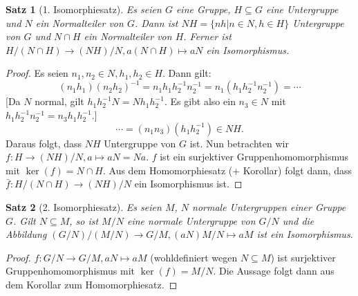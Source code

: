 \documentclass[12pt]{scrartcl} %
\newtheorem{thm}{Satz}
\theoremstyle{definition}
\theoremstyle{remark}
\begin{document}
\begin{thm}[1. Isomorphiesatz]
	Es seien $G$ eine Gruppe, $H \subseteq G$ eine Untergruppe und $N$ ein Normalteiler von $G$.
	Dann ist $NH = \{nh | n \in N, h \in H\}$ Untergruppe von $G$ und $N \cap H$ ein Normalteiler von $H$.
	Ferner ist $H/(N \cap H) \rightarrow (NH)/N, a(N \cap H) \mapsto aN$ ein Isomorphismus.
\end{thm}

\begin{proof}
	Es seien $n_1, n_2 \in N, h_1, h_2 \in H$. Dann gilt:
	$$ (n_1h_1)(n_2h_2)^{-1} = n_1h_1h_2^{-1}n_2^{-1} = n_1(h_1h_2^{-1}n_2^{-1}) = \dotsb $$
	[Da $N$ normal, gilt $h_1h_2^{-1}N = Nh_1h_2^{-1}$.
	Es gibt also ein $n_3 \in N$ mit $h_1h_2^{-1}n_2^{-1} = n_3h_1h_2^{-1}$.]
	$$ \dotsb = (n_1n_3)(h_1h_2^{-1}) \in NH.$$
	Daraus folgt, dass $NH$ Untergruppe von $G$ ist.
	Nun betrachten wir $f: H \rightarrow (NH)/N, a \mapsto aN = Na$.
	$f$ ist ein surjektiver Gruppenhomomorphismus mit $\ker(f) = N \cap H$.
	Aus dem Homomorphiesatz (+ Korollar) folgt dann, dass $\bar{f}: H/(N \cap H) \rightarrow (NH)/N$ ein Isomorphismus ist.
\end{proof}

\begin{thm}[2. Isomorphiesatz]
	Es seien \(M\), \(N\) normale Untergruppen einer Gruppe $G$.
	Gilt $N \subseteq M$, so ist $M/N$ eine normale Untergruppe von $G/N$ und die Abbildung $(G/N)/(M/N) \rightarrow G/M, (aN)M/N \mapsto aM$ ist ein Isomorphismus.
\end{thm}

\begin{proof}
	$f: G/N \rightarrow G/M, aN \mapsto aM$ (wohldefiniert wegen $N \subseteq M$) ist surjektiver Gruppenhomomorphismus mit $\ker(f) = M/N$.
	Die Aussage folgt dann aus dem Korollar zum Homomorphiesatz.
\end{proof}
\end{document}
